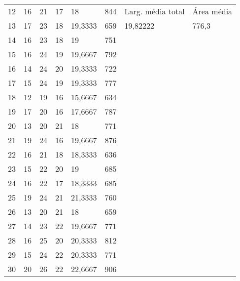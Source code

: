 \begin{anexosenv}
\begin{table}[hbtp!]
\begin{tabular}{|l|l|l|l|l|l|l|l|}
12 & 16  & 21  & 17  & 18          & 844  & Larg. média total & \multicolumn{1}{l|}{Área média}             \\\cline{7-8}
13 & 17  & 23  & 18  & 19,3333     & 659  & 19,82222         & 776,3                  \\
14 & 16  & 23  & 18  & 19          & 751  &                  &                        \\
15 & 16  & 24  & 19  & 19,6667     & 792  &                  &                        \\
16 & 14  & 24  & 20  & 19,3333     & 722  &                  &                        \\
17 & 15  & 24  & 19  & 19,3333     & 777  &                  &                        \\
18 & 12  & 19  & 16  & 15,6667     & 634  &                  &                        \\
19 & 17  & 20  & 16  & 17,6667     & 787  &                  &                        \\
20 & 13  & 20  & 21  & 18          & 771  &                  &                        \\
21 & 19  & 24  & 16  & 19,6667     & 876  &                  &                        \\
22 & 16  & 21  & 18  & 18,3333     & 636  &                  &                        \\
23 & 15  & 22  & 20  & 19          & 685  &                  &                        \\
24 & 16  & 22  & 17  & 18,3333     & 685  &                  &                        \\
25 & 19  & 24  & 21  & 21,3333     & 760  &                  &                        \\
26 & 13  & 20  & 21  & 18          & 659  &                  &                        \\
27 & 14  & 23  & 22  & 19,6667     & 771  &                  &                        \\
28 & 16  & 25  & 20  & 20,3333     & 812  &                  &                        \\
29 & 15  & 24  & 22  & 20,3333     & 771  &                  &                        \\
30 & 20  & 26  & 22  & 22,6667     & 906  &                  &                       \\\hline
\end{tabular}
\end{table}


\end{anexosenv}
